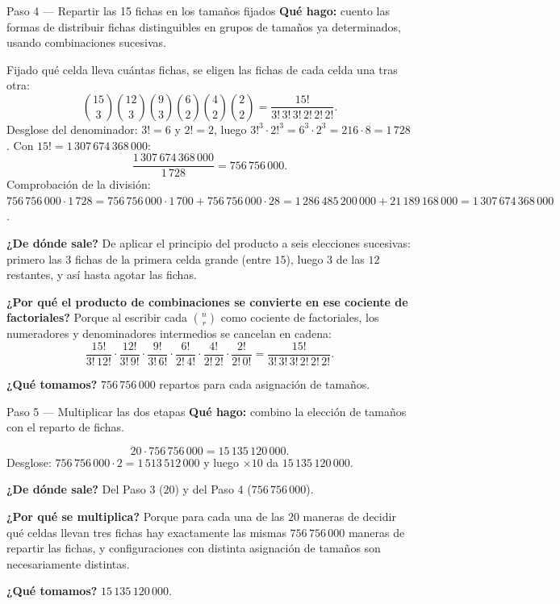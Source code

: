 \documentclass[11pt]{article}
\begin{document}
\begin{paso}{Paso 4 --- Repartir las 15 fichas en los tamaños fijados}
\textbf{Qué hago:} cuento las formas de distribuir fichas distinguibles en grupos de tamaños ya determinados, usando combinaciones sucesivas.

Fijado qué celda lleva cuántas fichas, se eligen las fichas de cada celda una tras otra:
\[
\binom{15}{3}\binom{12}{3}\binom{9}{3}\binom{6}{2}\binom{4}{2}\binom{2}{2}
= \frac{15!}{3!\,3!\,3!\,2!\,2!\,2!} .
\]
Desglose del denominador: $3!=6$ y $2!=2$, luego $3!^3\cdot 2!^3 = 6^3\cdot 2^3 = 216\cdot 8 = 1\,728$. Con $15! = 1\,307\,674\,368\,000$:
\[
\frac{1\,307\,674\,368\,000}{1\,728} = 756\,756\,000 .
\]
Comprobación de la división: $756\,756\,000\cdot 1\,728 = 756\,756\,000\cdot 1\,700 + 756\,756\,000\cdot 28 = 1\,286\,485\,200\,000 + 21\,189\,168\,000 = 1\,307\,674\,368\,000$.

\textbf{¿De dónde sale?} De aplicar el principio del producto a seis elecciones sucesivas: primero las $3$ fichas de la primera celda grande (entre $15$), luego $3$ de las $12$ restantes, y así hasta agotar las fichas.

\textbf{¿Por qué el producto de combinaciones se convierte en ese cociente de factoriales?} Porque al escribir cada $\binom{n}{r}$ como cociente de factoriales, los numeradores y denominadores intermedios se cancelan en cadena:
\[
\frac{15!}{3!\,12!}\cdot\frac{12!}{3!\,9!}\cdot\frac{9!}{3!\,6!}\cdot\frac{6!}{2!\,4!}\cdot\frac{4!}{2!\,2!}\cdot\frac{2!}{2!\,0!} = \frac{15!}{3!\,3!\,3!\,2!\,2!\,2!} .
\]

\textbf{¿Qué tomamos?} $756\,756\,000$ repartos para cada asignación de tamaños.
\end{paso}

\begin{paso}{Paso 5 --- Multiplicar las dos etapas}
\textbf{Qué hago:} combino la elección de tamaños con el reparto de fichas.

\[
20 \cdot 756\,756\,000 = 15\,135\,120\,000 .
\]
Desglose: $756\,756\,000\cdot 2 = 1\,513\,512\,000$ y luego $\times 10$ da $15\,135\,120\,000$.

\textbf{¿De dónde sale?} Del Paso 3 ($20$) y del Paso 4 ($756\,756\,000$).

\textbf{¿Por qué se multiplica?} Porque para cada una de las $20$ maneras de decidir qué celdas llevan tres fichas hay exactamente las mismas $756\,756\,000$ maneras de repartir las fichas, y configuraciones con distinta asignación de tamaños son necesariamente distintas.

\textbf{¿Qué tomamos?} $15\,135\,120\,000$.
\end{paso}
\end{document}
